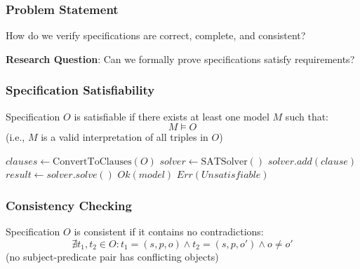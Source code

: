 \subsubsection{Problem Statement}

How do we verify specifications are correct, complete, and consistent?

\textbf{Research Question}: Can we formally prove specifications satisfy requirements?

\subsubsection{Specification Satisfiability}

\begin{definition}
    Specification $O$ is satisfiable if there exists at least one model $M$ such that:
    \begin{equation}
        M \models O
    \end{equation}
    (i.e., $M$ is a valid interpretation of all triples in $O$)
\end{definition}

\begin{algorithm}
\caption{Satisfiability Checking}
\begin{algorithmic}[1]
    \State $clauses \gets \text{ConvertToClauses}(O)$ 
    \State $solver \gets \text{SATSolver}()$
        \State $solver.add(clause)$
    \EndFor
    \State $result \gets solver.solve()$
        \State \Return $Ok(model)$
    \Else
        \State \Return $Err(Unsatisfiable)$
    \EndIf
\EndProcedure
\end{algorithmic}
\end{algorithm}

\subsubsection{Consistency Checking}

\begin{definition}
    Specification $O$ is consistent if it contains no contradictions:
    \begin{equation}
        \nexists t_1, t_2 \in O : t_1 = (s, p, o) \land t_2 = (s, p, o') \land o \neq o'
    \end{equation}
    (no subject-predicate pair has conflicting objects)
\end{definition}

